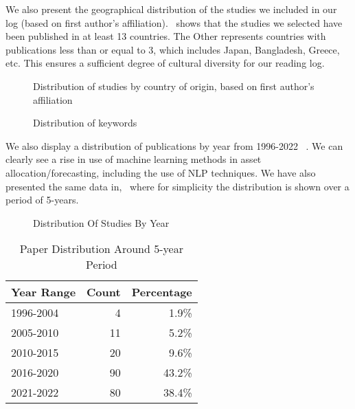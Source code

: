 \documentclass[11pt]{article}
\begin{document}
We also present  the geographical distribution of the studies we included in our log (based on first author's affiliation).~ shows that the studies we selected have been published in at least 13 countries. The Other represents countries with publications less than or equal to 3, which includes Japan, Bangladesh, Greece, etc. This ensures a sufficient degree of cultural diversity for our reading log. 
 \begin{figure}
    \resizebox{\columnwidth}{!}{
    
    }
     \caption{Distribution of studies by country of origin, based on first author's affiliation}
    \label{F:countrydistribution}
 \end{figure}

 \begin{figure}
    \resizebox{\columnwidth}{!}{
     
     }
     \caption{Distribution of keywords}
     \label{F:keywords}
 \end{figure}


We also display a distribution of publications by year from 1996-2022 ~. We can clearly see a rise in use of machine learning methods in asset allocation/forecasting, including the use of NLP techniques. We have also presented the same data in,~ where for simplicity the distribution is shown over a period of 5-years.


 \begin{figure}
    \resizebox{\columnwidth}{!}{
     
     }
     \caption{Distribution Of Studies By Year}
     \label{F:publicationbyyear}
 \end{figure}


\begin{table}
\caption{Paper Distribution Around 5-year Period}
\label{T:paperdistributionbyfiveyear}
\begin{tabularx}{\columnwidth}{X r r}
\toprule
Year Range  & Count & Percentage \\
\midrule
1996-2004  & 4 & 1.9\% \\
2005-2010  & 11 & 5.2\% \\
2010-2015 & 20 & 9.6\% \\
2016-2020 & 90 & 43.2\%\\
2021-2022 & 80 & 38.4\%\\


\midrule
\end{tabularx}
\end{table}
\end{document}
